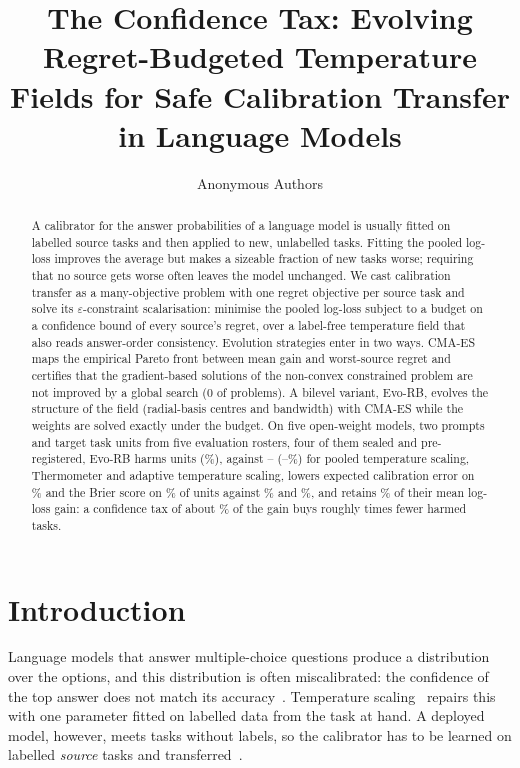 \documentclass[runningheads]{llncs}
\begin{document}
\title{The Confidence Tax: Evolving Regret-Budgeted Temperature Fields for Safe Calibration Transfer in Language Models}
\author{Anonymous Authors}
\maketitle

\begin{abstract}
A calibrator for the answer probabilities of a language model is usually fitted on labelled source tasks and then applied to new, unlabelled tasks.
Fitting the pooled log-loss improves the average but makes a sizeable fraction of new tasks worse; requiring that no source gets worse often leaves the model unchanged.
We cast calibration transfer as a many-objective problem with one regret objective per source task and solve its $\varepsilon$-constraint scalarisation: minimise the pooled log-loss subject to a budget on a confidence bound of every source's regret, over a label-free temperature field that also reads answer-order consistency.
Evolution strategies enter in two ways.
CMA-ES maps the empirical Pareto front between mean gain and worst-source regret and certifies that the gradient-based solutions of the non-convex constrained problem are not improved by a global search (0 of \FrontPairs{} problems).
A bilevel variant, Evo-RB, evolves the structure of the field (radial-basis centres and bandwidth) with CMA-ES while the weights are solved exactly under the budget.
On five open-weight models, two prompts and \NTotal{} target task units from five evaluation rosters, four of them sealed and pre-registered, Evo-RB harms \AggEvoHarm{} units (\AggEvoHarmRate\%), against \AggThermoHarm--\AggAtsHarm{} (\AggThermoHarmRate--\AggAtsHarmRate\%) for pooled temperature scaling, Thermometer and adaptive temperature scaling, lowers expected calibration error on \AggEvoEceDown\% and the Brier score on \AggEvoBrierDown\% of units against \AggThermoEceDown\% and \AggThermoBrierDown\%, and retains \RetainEvo\% of their mean log-loss gain: a confidence tax of about \TaxEvo\% of the gain buys roughly \HarmRatio{} times fewer harmed tasks.
\end{abstract}

\section{Introduction}
Language models that answer multiple-choice questions produce a distribution over the options, and this distribution is often miscalibrated: the confidence of the top answer does not match its accuracy~\cite{kadavath2022know,zhao2021calibrate}.
Temperature scaling~\cite{guo2017calibration} repairs this with one parameter fitted on labelled data from the task at hand.
A deployed model, however, meets tasks without labels, so the calibrator has to be learned on labelled \emph{source} tasks and transferred~\cite{yu2022multidomain,shen2024thermometer,xie2024ats}.
\end{document}
